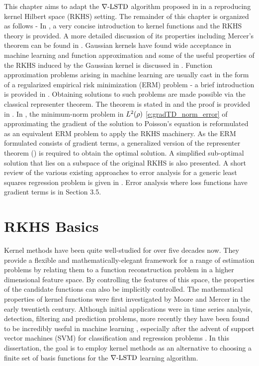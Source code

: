 This chapter aims to adapt the $\nabla\text{-LSTD}$ algorithm proposed in  in a reproducing kernel Hilbert space (RKHS) setting.  The remainder of this chapter is organized as follows - In , a very concise introduction to kernel functions and the RKHS theory is provided. A more detailed discussion of its properties including Mercer's theorem can be found in . Gaussian kernels have found wide acceptance in machine learning and function approximation and some of the useful properties of the RKHS induced by the Gaussian kernel is discussed in . Function approximation problems arising in machine learning are usually cast in the form of a regularized empirical risk minimization (ERM) problem - a brief introduction is provided in . Obtaining solutions to such problems are made possible via the classical representer theorem. The theorem is stated in  and the proof is provided in . In , the minimum-norm problem in $L^2(\rho)$ \eqref{e:gradTD_norm_error} of approximating the gradient of the solution to Poisson's equation is reformulated as an equivalent ERM problem to apply the RKHS machinery. As the ERM formulated consists of gradient terms, a generalized  version of the representer theorem () is required to obtain the optimal solution.  A simplified sub-optimal solution that lies on a subspace of the original RKHS is also presented. A short review of the various existing approaches to error analysis for a generic least squares regression problem is given  in . Error analysis where loss functions have gradient terms is in Section 3.5.

\section{RKHS Basics}
\label{s:rkhs_basics}
Kernel methods have been quite well-studied for over five decades now. They provide a flexible and mathematically-elegant framework for a range of estimation problems by relating them to a function reconstruction problem in a higher dimensional feature space. By controlling the features of this space, the properties of the candidate functions can also be implicitly controlled. The mathematical properties of kernel functions were first investigated by Moore \cite{moo1916} and Mercer \cite{merrus09} in the early twentieth century. Although initial applications were in time series analysis, detection, filtering and prediction problems, more recently they have been found to be incredibly useful in machine learning \cite{wah90}, especially after the advent of support vector machines (SVM) for classification and regression problems \cite{corvap95, drucburkaufsmovap97}. In this dissertation, the goal is to employ kernel methods as an alternative to choosing a finite set of basis functions for the $\nabla\text{-LSTD}$ learning algorithm. 


